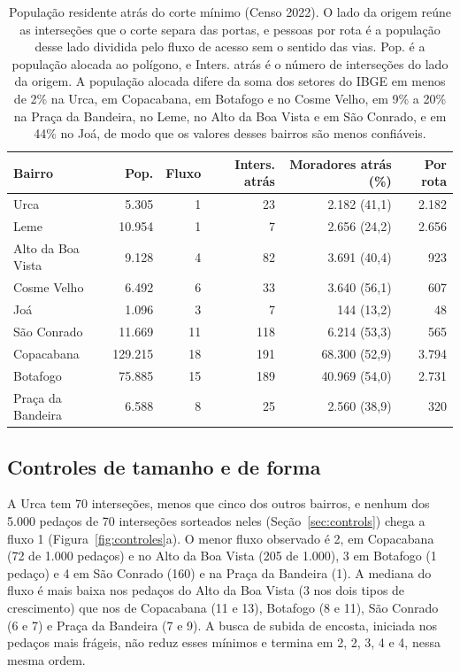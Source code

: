 \begin{table}[tbp]
\centering
\caption{População residente atrás do corte mínimo (Censo 2022). O lado da
origem reúne as interseções que o corte separa das portas, e pessoas por rota é
a população desse lado dividida pelo fluxo de acesso sem o sentido das vias. Pop. é a população alocada ao polígono, e Inters. atrás é o número de
interseções do lado da origem. A população alocada difere da soma dos setores
do IBGE em menos de 2\% na Urca, em Copacabana, em Botafogo e no Cosme Velho,
em 9\% a 20\% na Praça da Bandeira, no Leme, no Alto da Boa Vista e em São
Conrado, e em 44\% no Joá, de modo que os valores desses bairros são menos
confiáveis.}
\label{tab:pop}
\small
\setlength{\tabcolsep}{3pt}
\begin{tabular}{lrrrrr}
\toprule
Bairro & Pop. & Fluxo & Inters. atrás & Moradores atrás (\%) & Por rota \\
\midrule
Urca              &   5.305 &  1 &  23 &  2.182 (41,1) & 2.182 \\
Leme              &  10.954 &  1 &   7 &  2.656 (24,2) & 2.656 \\
Alto da Boa Vista &   9.128 &  4 &  82 &  3.691 (40,4) &   923 \\
Cosme Velho       &   6.492 &  6 &  33 &  3.640 (56,1) &   607 \\
Joá               &   1.096 &  3 &   7 &    144 (13,2) &    48 \\
São Conrado       &  11.669 & 11 & 118 &  6.214 (53,3) &   565 \\
Copacabana        & 129.215 & 18 & 191 & 68.300 (52,9) & 3.794 \\
Botafogo          &  75.885 & 15 & 189 & 40.969 (54,0) & 2.731 \\
Praça da Bandeira &   6.588 &  8 &  25 &  2.560 (38,9) &   320 \\
\bottomrule
\end{tabular}
\end{table}

\subsection{Controles de tamanho e de forma}
\label{sec:res-controls}

A Urca tem 70 interseções, menos que cinco dos outros bairros, e nenhum dos
5.000 pedaços de 70 interseções sorteados neles (Seção~\ref{sec:controls})
chega a fluxo 1 (Figura~\ref{fig:controles}a). O menor fluxo observado é 2, em
Copacabana (72 de 1.000 pedaços) e no Alto da Boa Vista (205 de 1.000), 3 em
Botafogo (1 pedaço) e 4 em São Conrado (160) e na Praça da Bandeira (1). A
mediana do fluxo é mais baixa nos pedaços do Alto da Boa Vista (3 nos dois
tipos de crescimento) que nos de Copacabana (11 e 13), Botafogo (8 e 11), São
Conrado (6 e 7) e Praça da Bandeira (7 e 9). A busca de subida de encosta,
iniciada nos pedaços mais frágeis, não reduz esses mínimos e termina em 2, 2,
3, 4 e 4, nessa mesma ordem.

